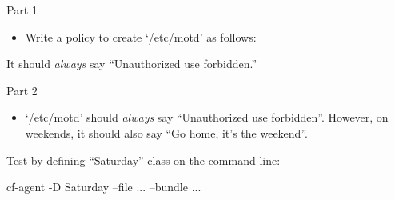 \begin{aside}
\label{aside:exercise_54}

Part 1

\begin{itemize}
\item{} Write a policy to create `/etc/motd' as follows:
\end{itemize}

It should \emph{always} say ``Unauthorized use forbidden.''

Part 2

\begin{itemize}
\item{} `/etc/motd' should \emph{always} say ``Unauthorized use forbidden''. However, on weekends, it should also say ``Go home, it's the weekend''.
\end{itemize}

Test by defining ``Saturday'' class on the command line:

\begin{code}
cf-agent -D Saturday  --file ... --bundle ...
\end{code}

\end{aside}